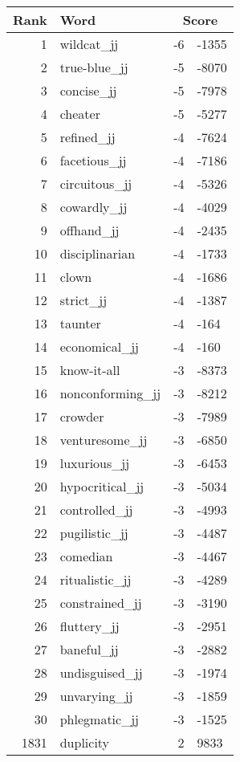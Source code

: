 \begin{longtable}[!htbp]{| rlr@{.}l |}
    \hline
    \textbf{Rank} & \textbf{Word} & \multicolumn{2}{c|}{\textbf{Score}} \\
    \hline
    \endhead
    1 & wildcat\_jj & -6 & -1355 \\
    2 & true-blue\_jj & -5 & -8070 \\
    3 & concise\_jj & -5 & -7978 \\
    4 & cheater & -5 & -5277 \\
    5 & refined\_jj & -4 & -7624 \\
    6 & facetious\_jj & -4 & -7186 \\
    7 & circuitous\_jj & -4 & -5326 \\
    8 & cowardly\_jj & -4 & -4029 \\
    9 & offhand\_jj & -4 & -2435 \\
    10 & disciplinarian & -4 & -1733 \\
    11 & clown & -4 & -1686 \\
    12 & strict\_jj & -4 & -1387 \\
    13 & taunter & -4 & -164 \\
    14 & economical\_jj & -4 & -160 \\
    15 & know-it-all & -3 & -8373 \\
    16 & nonconforming\_jj & -3 & -8212 \\
    17 & crowder & -3 & -7989 \\
    18 & venturesome\_jj & -3 & -6850 \\
    19 & luxurious\_jj & -3 & -6453 \\
    20 & hypocritical\_jj & -3 & -5034 \\
    21 & controlled\_jj & -3 & -4993 \\
    22 & pugilistic\_jj & -3 & -4487 \\
    23 & comedian & -3 & -4467 \\
    24 & ritualistic\_jj & -3 & -4289 \\
    25 & constrained\_jj & -3 & -3190 \\
    26 & fluttery\_jj & -3 & -2951 \\
    27 & baneful\_jj & -3 & -2882 \\
    28 & undisguised\_jj & -3 & -1974 \\
    29 & unvarying\_jj & -3 & -1859 \\
    30 & phlegmatic\_jj & -3 & -1525 \\
    1831 & duplicity & 2 & 9833 \\

\end{longtable}
